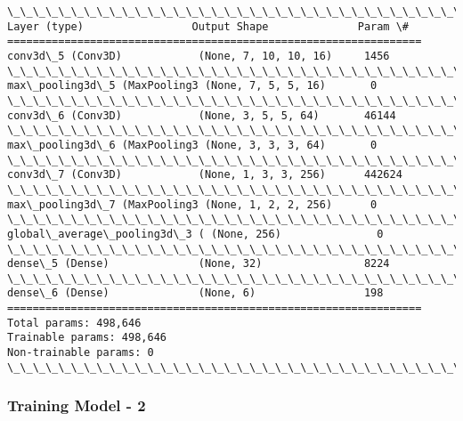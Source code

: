 \documentclass[11pt]{article}
\begin{document}
    \begin{Verbatim}[commandchars=\\\{\}]
\_\_\_\_\_\_\_\_\_\_\_\_\_\_\_\_\_\_\_\_\_\_\_\_\_\_\_\_\_\_\_\_\_\_\_\_\_\_\_\_\_\_\_\_\_\_\_\_\_\_\_\_\_\_\_\_\_\_\_\_\_\_\_\_\_
Layer (type)                 Output Shape              Param \#   
=================================================================
conv3d\_5 (Conv3D)            (None, 7, 10, 10, 16)     1456      
\_\_\_\_\_\_\_\_\_\_\_\_\_\_\_\_\_\_\_\_\_\_\_\_\_\_\_\_\_\_\_\_\_\_\_\_\_\_\_\_\_\_\_\_\_\_\_\_\_\_\_\_\_\_\_\_\_\_\_\_\_\_\_\_\_
max\_pooling3d\_5 (MaxPooling3 (None, 7, 5, 5, 16)       0         
\_\_\_\_\_\_\_\_\_\_\_\_\_\_\_\_\_\_\_\_\_\_\_\_\_\_\_\_\_\_\_\_\_\_\_\_\_\_\_\_\_\_\_\_\_\_\_\_\_\_\_\_\_\_\_\_\_\_\_\_\_\_\_\_\_
conv3d\_6 (Conv3D)            (None, 3, 5, 5, 64)       46144     
\_\_\_\_\_\_\_\_\_\_\_\_\_\_\_\_\_\_\_\_\_\_\_\_\_\_\_\_\_\_\_\_\_\_\_\_\_\_\_\_\_\_\_\_\_\_\_\_\_\_\_\_\_\_\_\_\_\_\_\_\_\_\_\_\_
max\_pooling3d\_6 (MaxPooling3 (None, 3, 3, 3, 64)       0         
\_\_\_\_\_\_\_\_\_\_\_\_\_\_\_\_\_\_\_\_\_\_\_\_\_\_\_\_\_\_\_\_\_\_\_\_\_\_\_\_\_\_\_\_\_\_\_\_\_\_\_\_\_\_\_\_\_\_\_\_\_\_\_\_\_
conv3d\_7 (Conv3D)            (None, 1, 3, 3, 256)      442624    
\_\_\_\_\_\_\_\_\_\_\_\_\_\_\_\_\_\_\_\_\_\_\_\_\_\_\_\_\_\_\_\_\_\_\_\_\_\_\_\_\_\_\_\_\_\_\_\_\_\_\_\_\_\_\_\_\_\_\_\_\_\_\_\_\_
max\_pooling3d\_7 (MaxPooling3 (None, 1, 2, 2, 256)      0         
\_\_\_\_\_\_\_\_\_\_\_\_\_\_\_\_\_\_\_\_\_\_\_\_\_\_\_\_\_\_\_\_\_\_\_\_\_\_\_\_\_\_\_\_\_\_\_\_\_\_\_\_\_\_\_\_\_\_\_\_\_\_\_\_\_
global\_average\_pooling3d\_3 ( (None, 256)               0         
\_\_\_\_\_\_\_\_\_\_\_\_\_\_\_\_\_\_\_\_\_\_\_\_\_\_\_\_\_\_\_\_\_\_\_\_\_\_\_\_\_\_\_\_\_\_\_\_\_\_\_\_\_\_\_\_\_\_\_\_\_\_\_\_\_
dense\_5 (Dense)              (None, 32)                8224      
\_\_\_\_\_\_\_\_\_\_\_\_\_\_\_\_\_\_\_\_\_\_\_\_\_\_\_\_\_\_\_\_\_\_\_\_\_\_\_\_\_\_\_\_\_\_\_\_\_\_\_\_\_\_\_\_\_\_\_\_\_\_\_\_\_
dense\_6 (Dense)              (None, 6)                 198       
=================================================================
Total params: 498,646
Trainable params: 498,646
Non-trainable params: 0
\_\_\_\_\_\_\_\_\_\_\_\_\_\_\_\_\_\_\_\_\_\_\_\_\_\_\_\_\_\_\_\_\_\_\_\_\_\_\_\_\_\_\_\_\_\_\_\_\_\_\_\_\_\_\_\_\_\_\_\_\_\_\_\_\_

    \end{Verbatim}

    \hypertarget{training-model---2}{%
\subsubsection{Training Model - 2}\label{training-model---2}}
\end{document}
